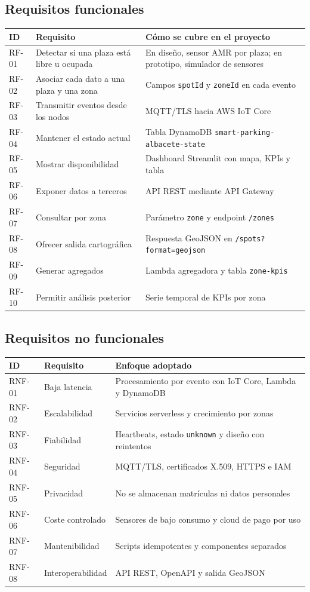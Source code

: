 \documentclass[11pt,a4paper]{article}
\begin{document}
\subsection{Requisitos funcionales}
\begin{longtable}{P{1.6cm}P{5.6cm}P{7.5cm}}
\toprule
\textbf{ID} & \textbf{Requisito} & \textbf{Cómo se cubre en el proyecto} \\
\midrule
\endhead
RF-01 & Detectar si una plaza está libre u ocupada & En diseño, sensor AMR por plaza; en prototipo, simulador de sensores \\
RF-02 & Asociar cada dato a una plaza y una zona & Campos \texttt{spotId} y \texttt{zoneId} en cada evento \\
RF-03 & Transmitir eventos desde los nodos & MQTT/TLS hacia AWS IoT Core \\
RF-04 & Mantener el estado actual & Tabla DynamoDB \texttt{smart-parking-albacete-state} \\
RF-05 & Mostrar disponibilidad & Dashboard Streamlit con mapa, KPIs y tabla \\
RF-06 & Exponer datos a terceros & API REST mediante API Gateway \\
RF-07 & Consultar por zona & Parámetro \texttt{zone} y endpoint \texttt{/zones} \\
RF-08 & Ofrecer salida cartográfica & Respuesta GeoJSON en \texttt{/spots?format=geojson} \\
RF-09 & Generar agregados & Lambda agregadora y tabla \texttt{zone-kpis} \\
RF-10 & Permitir análisis posterior & Serie temporal de KPIs por zona \\
\bottomrule
\end{longtable}

\subsection{Requisitos no funcionales}
\begin{longtable}{P{1.6cm}P{5.6cm}P{7.5cm}}
\toprule
\textbf{ID} & \textbf{Requisito} & \textbf{Enfoque adoptado} \\
\midrule
\endhead
RNF-01 & Baja latencia & Procesamiento por evento con IoT Core, Lambda y DynamoDB \\
RNF-02 & Escalabilidad & Servicios serverless y crecimiento por zonas \\
RNF-03 & Fiabilidad & Heartbeats, estado \texttt{unknown} y diseño con reintentos \\
RNF-04 & Seguridad & MQTT/TLS, certificados X.509, HTTPS e IAM \\
RNF-05 & Privacidad & No se almacenan matrículas ni datos personales \\
RNF-06 & Coste controlado & Sensores de bajo consumo y cloud de pago por uso \\
RNF-07 & Mantenibilidad & Scripts idempotentes y componentes separados \\
RNF-08 & Interoperabilidad & API REST, OpenAPI y salida GeoJSON \\
\bottomrule
\end{longtable}
\end{document}
